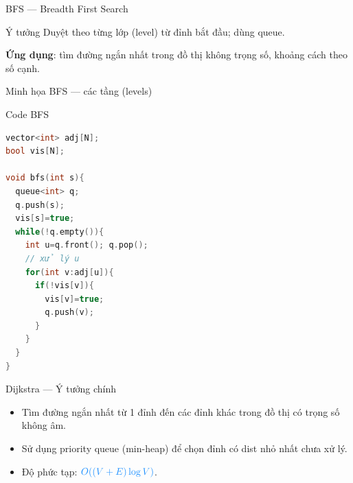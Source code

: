 \documentclass{beamer}
\newcommand{\hlblue}[1]{\textcolor{myblue}{#1}}
\newcommand{\hlgreen}[1]{\textcolor{mygreen}{#1}}
\newcommand{\hlpurple}[1]{\textcolor{mypurple}{#1}}
\newcommand{\hlorange}[1]{\textcolor{myorange}{#1}}
\newcommand{\hlcyan}[1]{\textcolor{mycyan}{#1}}
\begin{document}
\begin{frame}{\hlorange{BFS} — Breadth First Search}
\begin{block}{\hlgreen{Ý tưởng}}
Duyệt theo từng lớp (\hlpurple{level}) từ đỉnh bắt đầu; dùng \hlpurple{queue}.
\end{block}
\medskip
\textbf{Ứng dụng}: tìm đường ngắn nhất trong đồ thị không trọng số, khoảng cách theo số cạnh.
\end{frame}

\begin{frame}{\hlorange{Minh họa BFS} — các tầng (levels)}
\begin{center}
\end{center}
\end{frame}

\begin{frame}[fragile]{\hlorange{Code BFS}}
\begin{lstlisting}[language=C++]
vector<int> adj[N];
bool vis[N];

void bfs(int s){
  queue<int> q;
  q.push(s);
  vis[s]=true;
  while(!q.empty()){
    int u=q.front(); q.pop();
    // xử lý u
    for(int v:adj[u]){
      if(!vis[v]){
        vis[v]=true;
        q.push(v);
      }
    }
  }
}
\end{lstlisting}
\end{frame}

\begin{frame}{\hlorange{Dijkstra} — Ý tưởng chính}
\begin{itemize}
\item Tìm đường ngắn nhất từ 1 đỉnh đến các đỉnh khác trong đồ thị có trọng số không âm.
\item Sử dụng \hlpurple{priority queue} (min-heap) để chọn đỉnh có \hlblue{dist} nhỏ nhất chưa xử lý.
\item Độ phức tạp: \(\hlblue{O((V+E)\log V)}\).
\end{itemize}
\end{frame}
\end{document}
